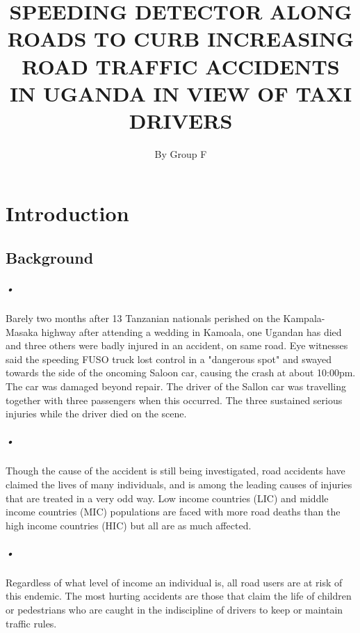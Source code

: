 \documentclass[12pt]{report}
\begin{document}
\newpage

\title{SPEEDING DETECTOR ALONG ROADS TO CURB INCREASING ROAD TRAFFIC ACCIDENTS IN UGANDA IN VIEW OF TAXI DRIVERS}
\author{By Group F}      
\renewcommand{\today}{}

\maketitle
\tableofcontents

\chapter{Introduction}
\section{Background}
\paragraph{•}
Barely two months after 13 Tanzanian nationals perished on the Kampala-Masaka highway after attending a wedding in Kamoala, one Ugandan has died and three others were badly injured in an accident, on same road. Eye witnesses said the speeding FUSO truck lost control in a "dangerous spot" and swayed towards the side of the oncoming Saloon car, causing the crash at about 10:00pm. The car was damaged beyond repair. The driver of the Sallon car was travelling together with three passengers when this occurred. The three sustained serious injuries while the driver died on the scene.\cite{newvision} 
\paragraph{•}
Though the cause of the accident is still being investigated, road accidents have claimed the lives of many individuals, and is among the leading causes of injuries that are treated in a very odd way. Low income countries (LIC) and middle income countries (MIC) populations are faced with more road deaths than the high income countries (HIC) but all are as much affected.
\paragraph{•}
Regardless of what level of income an individual is, all road users are at risk of this endemic. The most hurting accidents are those that claim the life of children or pedestrians who are caught in the indiscipline of drivers to keep or maintain traffic rules. 
\end{document}
